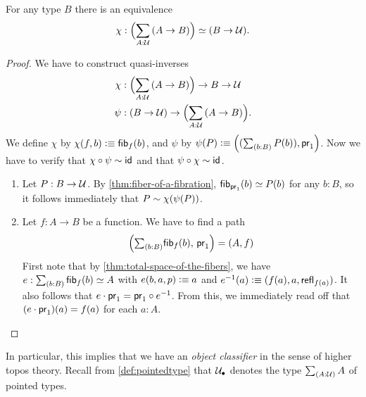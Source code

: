 \begin{thm}\label{thm:nobject-classifier-appetizer}
For any type $B$ there is an equivalence
\begin{equation*}
\chi:\Parens{\sm{A:\type} (A\to B)}\eqvsym (B\to\type).
\end{equation*}
\end{thm}
\begin{proof}
We have to construct quasi-inverses
\begin{align*}
\chi & : \Parens{\sm{A:\type} (A\to B)}\to B\to\type\\
\psi & : (B\to\type)\to\Parens{\sm{A:\type} (A\to B)}.
\end{align*}
We define $\chi$ by $\chi(f,b)\vcentcolon\equiv{\mathsf{fib}}_{f}(b)$, and $\psi$ by $\psi(P)\defeq\Pairr{(\sm{b:B} P(b)),\proj1}$.
Now we have to verify that $\chi\circ\psi\sim\mathsf{id}_{}{}$ and that $\psi\circ\chi \sim\mathsf{id}_{}{}$.
\begin{enumerate}
\item Let $P:B\to\mathcal{U}$.
  By \autoref{thm:fiber-of-a-fibration},
${\mathsf{fib}}_{\mathsf{pr}_{1}}(b)\simeq P(b)$ for any $b:B$, so it follows immediately
that $P\sim\chi(\psi(P))$.
\item Let $f:A\to B$ be a function. We have to find a path
\begin{equation*}
\Pairr{\tsm{b:B} \hfiber{f}b,\,\proj1}=\pairr{A,f}
\end{equation*}
First note that by \autoref{thm:total-space-of-the-fibers}, we have
$e:\sm{b:B} \hfiber{f}b\eqvsym A$ with $e(b,a,p)\vcentcolon\equiv a$ and $e^{-1}(a)
\vcentcolon\equiv(f(a),a,\mathsf{refl}_{f(a)})$. It also follows that
$e\cdot\mathsf{pr}_{1}=\mathsf{pr}_{1}\circ e^{-1}$. From this, we immediately read off
that $(e\cdot\mathsf{pr}_{1})(a)= f(a)$ for each $a:A$.\qedhere
\end{enumerate}
\end{proof}

\noindent
In particular, this implies that we have an \emph{object classifier} in the sense of higher topos theory.
Recall from \autoref{def:pointedtype} that $\mathcal{U}_\bullet$ denotes the type $\sm{A:\type} A$ of pointed types.

